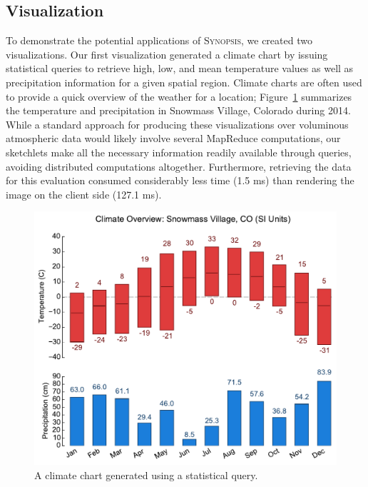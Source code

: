 \subsection{Visualization}
To demonstrate the potential applications of \textsc{Synopsis}, we created two visualizations. Our first visualization generated a climate chart by issuing statistical queries to retrieve high, low, and mean temperature values as well as precipitation information for a given spatial region. Climate charts are often used to provide a quick overview of the weather for a location; Figure~\ref{fig:climate} summarizes the temperature and precipitation in Snowmass Village, Colorado during 2014. While a standard approach for producing these visualizations over voluminous atmospheric data would likely involve several MapReduce computations, our sketchlets make all the necessary information readily available through queries, avoiding distributed computations altogether. Furthermore, retrieving the data for this evaluation consumed considerably less time (1.5 ms) than rendering the image on the client side (127.1 ms).
%
\begin{figure}[b]
    \centerline{\includegraphics[width=0.85\linewidth]{figures/climate-snowmass.pdf}}
    \caption{A climate chart generated using a statistical query.}
    \label{fig:climate}
\end{figure}

